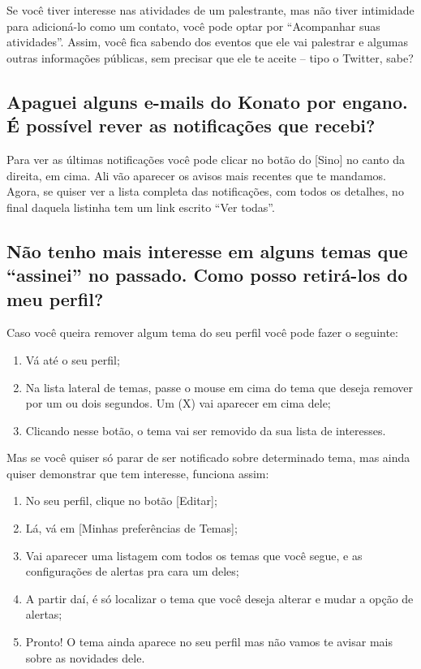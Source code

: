 \documentclass[12pt,a4paper,twoside,hyphens,english,brazil]{abntex2}
\newcommand{\adiado}{{\color{Bittersweet}\framebox[1.1\width]{ADIADO}}}
\begin{document}
{Se você tiver interesse nas atividades de um palestrante, mas não tiver intimidade para adicioná-lo como um contato, você pode optar por ``Acompanhar suas atividades''. Assim, você fica sabendo dos eventos que ele vai palestrar e algumas outras informações públicas, sem precisar que ele te aceite -- tipo o Twitter, sabe?



\subsection[Como revejo as notificações que já recebi?]{Apaguei alguns e-mails do Konato por engano. É possível rever as notificações que recebi?} \label{faq:notificacoes}
\adiado{} Para ver as últimas notificações você pode clicar no botão do [Sino]  no canto da direita, em cima. Ali vão aparecer os avisos mais recentes que te mandamos. Agora, se quiser ver a lista completa das notificações, com todos os detalhes, no final daquela listinha tem um link escrito ``Ver todas''.


\subsection[Como ``desassino'' temas?]{Não tenho mais interesse em alguns temas que ``assinei'' no passado. Como posso retirá-los do meu perfil?} \label{faq:configuracoes}
\adiado{} Caso você queira remover algum tema do seu perfil você pode fazer o seguinte:
\begin{enumerate}[itemsep=-1ex]
	\item Vá até o seu perfil;
	\item Na lista lateral de temas, passe o mouse em cima do tema que deseja remover por um ou dois segundos. Um (X) vai aparecer em cima dele;
	\item Clicando nesse botão, o tema vai ser removido da sua lista de interesses.
\end{enumerate}

\adiado{} Mas se você quiser só parar de ser notificado sobre determinado tema, mas ainda quiser demonstrar que tem interesse, funciona assim:
\begin{enumerate}[itemsep=-1ex]
	\item No seu perfil, clique no botão [Editar];
	\item Lá, vá em [Minhas preferências de Temas];
	\item Vai aparecer uma listagem com todos os temas que você segue, e as configurações de alertas pra cara um deles;
	\item A partir daí, é só localizar o tema que você deseja alterar e mudar a opção de alertas;
	\item Pronto! O tema ainda aparece no seu perfil mas não vamos te avisar mais sobre as novidades dele.
\end{enumerate}

}
\end{document}
